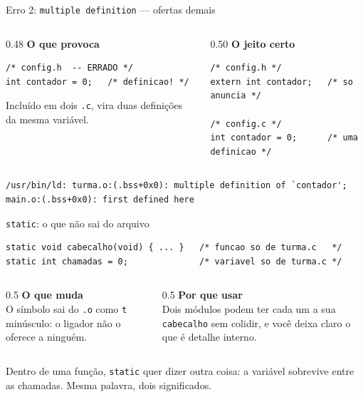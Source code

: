 \documentclass[aspectratio=169]{beamer}
\begin{document}
\begin{frame}[fragile]{Erro 2: \texttt{multiple definition} --- ofertas demais}
  \begin{columns}[T]
    \begin{column}{0.48\textwidth}
      \textbf{O que provoca}
\begin{lstlisting}[basicstyle=\ttfamily\tiny, numbers=none]
/* config.h  -- ERRADO */
int contador = 0;   /* definicao! */
\end{lstlisting}
      \small Incluído em dois \texttt{.c}, vira duas definições da mesma
      variável.
    \end{column}
    \begin{column}{0.50\textwidth}
      \textbf{O jeito certo}
\begin{lstlisting}[basicstyle=\ttfamily\tiny, numbers=none]
/* config.h */
extern int contador;   /* so anuncia */

/* config.c */
int contador = 0;      /* uma definicao */
\end{lstlisting}
    \end{column}
  \end{columns}
\begin{lstlisting}[style=shellStyle]
/usr/bin/ld: turma.o:(.bss+0x0): multiple definition of `contador';
main.o:(.bss+0x0): first defined here
\end{lstlisting}
\end{frame}

\begin{frame}[fragile]{\texttt{static}: o que não sai do arquivo}
\begin{lstlisting}[basicstyle=\ttfamily\scriptsize, numbers=none]
static void cabecalho(void) { ... }   /* funcao so de turma.c   */
static int chamadas = 0;              /* variavel so de turma.c */
\end{lstlisting}
  \begin{columns}[T]
    \begin{column}{0.5\textwidth}
      \textbf{O que muda}\\[0.2em]
      \small O símbolo sai do \texttt{.o} como \texttt{t} minúsculo: o
      ligador não o oferece a ninguém.
    \end{column}
    \begin{column}{0.5\textwidth}
      \textbf{Por que usar}\\[0.2em]
      \small Dois módulos podem ter cada um a sua \texttt{cabecalho} sem
      colidir, e você deixa claro o que é detalhe interno.
    \end{column}
  \end{columns}
  \begin{block}{}
    \small Dentro de uma função, \texttt{static} quer dizer outra coisa: a
    variável sobrevive entre as chamadas. Mesma palavra, dois significados.
  \end{block}
\end{frame}
\end{document}
